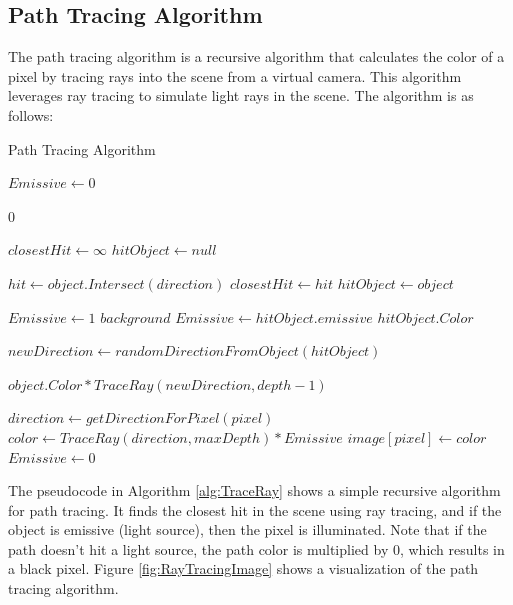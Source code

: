 \documentclass[12pt]{article}
\begin{document}
\subsection{Path Tracing Algorithm}

The path tracing algorithm is a recursive algorithm that calculates the color of a pixel by tracing rays into the scene from a virtual camera.
This algorithm leverages ray tracing to simulate light rays in the scene.
The algorithm is as follows:

\begin{algorithm}[H]
    \caption{Path Tracing Algorithm}
    \label{alg:TraceRay}
    \tiny
    \begin{algorithmic}[0]

        \State $Emissive \gets 0$

        \State \Return $0$ 
        \EndIf

        \State $closestHit \gets \infty$
        \State $hitObject \gets null$

        \State $hit \gets object.Intersect(direction)$
        \State $closestHit \gets hit$
        \State $hitObject \gets object$
        \EndIf
        \EndFor

        \State $Emissive \gets 1$ 
        \State \Return $background$
        \EndIf
        \State $Emissive \gets hitObject.emissive$
         
        \State \Return $hitObject.Color$
        \EndIf

        \State $newDirection \gets randomDirectionFromObject(hitObject)$

        \State \Return $object.Color * TraceRay(newDirection, depth - 1)$

        \EndProcedure

        \State $direction \gets getDirectionForPixel(pixel)$
        \State $color \gets TraceRay(direction, maxDepth) * Emissive$
        \State $image[pixel] \gets color$
        \State $Emissive \gets 0$ 
        \EndFor

    \end{algorithmic}
\end{algorithm}

The pseudocode in Algorithm \ref{alg:TraceRay} shows a simple recursive algorithm for path tracing.
It finds the closest hit in the scene using ray tracing, and if the object is emissive (light source), then the pixel is illuminated.
Note that if the path doesn't hit a light source, the path color is multiplied by 0, which results in a black pixel.
Figure \ref{fig:RayTracingImage} shows a visualization of the path tracing algorithm.
\end{document}
